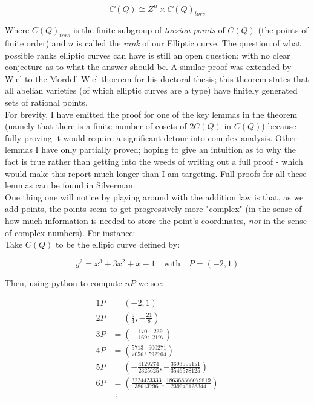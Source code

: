 \documentclass{article}
\begin{document}
\[C(Q) \cong Z^n \times C(Q)_{tors}\]

Where $C(Q)_{tors}$ is the finite subgroup of \emph{torsion points} of $C(Q)$ (the points of finite order) and $n$ is called the \emph{rank} of our Elliptic curve. The question of what possible ranks elliptic curves can have is still an open question; with no clear conjecture as to what the answer should be. A similar proof was extended by Wiel to the Mordell-Wiel thoerem for his doctoral thesis; this theorem states that all abelian varieties (of which elliptic curves are a type) have finitely generated sets of rational points.\\

For brevity, I have emitted the proof for one of the key lemmas in the theorem (namely that there is a finite number of cosets of $2C(Q)$ in $C(Q)$) because fully proving it would require a significant detour into complex analysis. Other lemmas I have only partially proved; hoping to give an intuition as to why the fact is true rather than getting into the weeds of writing out a full proof - which would make this report much longer than I am targeting. Full proofs for all these lemmas can be found in Silverman.\\

One thing one will notice by playing around with the addition law is that, as we add points, the points seem to get progressively more "complex" (in the sense of how much information is needed to store the point's coordinates, \emph{not} in the sense of complex numbers). For instance: \\

Take $C(Q)$ to be the ellipic curve defined by:

\[ y^2 = x^3 + 3x^2 + x - 1 \quad \text{with} \quad P = (-2, 1)\]

Then, using python to compute $nP$ we see:

\begin{align*}
    1P &= \left(-2,1 \right) \\ 
    2P &= \left(\frac{5}{4},- \frac{21}{8} \right) \\ 
    3P &= \left(- \frac{170}{169},\frac{239}{2197} \right) \\ 
    4P &= \left(\frac{5713}{7056},\frac{900271}{592704} \right) \\ 
    5P &= \left(- \frac{4129274}{2325625},- \frac{3693595151}{3546578125} \right) \\
    6P &= \left(\frac{3224423333}{38613796},\frac{186368366079819}{239946128344} \right) \\ 
    & \ \ \vdots
\end{align*}
\end{document}
